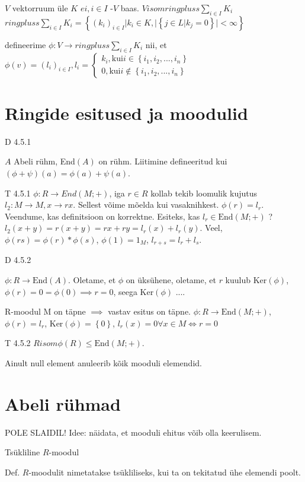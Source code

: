 \documentclass[12pt]{article}
\begin{document}
$V$ vektorruum \"ule $K$
$ei, i \in I$ -$V$ baas.
$V isom ringpluss \sum \limits_{i \in I} K_i$
$ringpluss \sum \limits_{i \in I} K_i = \left\{ (k_i)_{i \in I} | k_i \in K, | \left\{ j \in L | k_j = 0 \right\} | < \infty \right\}$

defineerime $\phi: V \to ringpluss \sum \limits_{i \in I} K_i$ nii, et $\phi(v) = (l_i)_{i \in I}, l_i = \begin{cases} k_i, \text{kui} i \in \left\{ i_1,i_2,...,i_n \right\} \\
0, \text{kui} i \not \in \left\{ i_1,i_2,...,i_n \right\}
\end{cases}$

\section{Ringide esitused ja moodulid}
D 4.5.1

$A$ Abeli r\"uhm, End$(A)$ on r\"uhm. Liitimine defineeritud kui $\left( \phi + \psi \right) \left( a \right) = \phi \left( a \right) + \psi \left( a \right)$. 

T 4.5.1
$\phi : R \to End(M;+)$, iga $r \in R$ kollab tekib loomulik kujutus $l_2: M \to M, x \to rx$. Sellest võime mõelda kui vasaknihkest.  $\phi \left( r \right ) = l_r$. Veendume, kas definitsioon on korrektne. Esiteks, kas $l_r \in \text{End}(M;+)$ ? $l_2 (x +y ) = r (x + y ) = rx + ry = l_r(x) + l_r(y)$. Veel, $\phi(rs) = \phi(r) * \phi(s)$, $\phi(1) = 1_M$, $l_{r+s} = l_r + l_s$.

D 4.5.2

$\phi: R \to \text{End}(A)$. Oletame, et $\phi$ on \"uks\"uhene, oletame, et $r$ kuulub Ker$(\phi)$, $\phi(r) = 0 = \phi(0) \implies r=0$, seega Ker$(\phi)$  ....

R-moodul M on täpne $\implies$ vastav esitus on täpne. $\phi : R \to \text{End}(M;+)$, $\phi(r) = l_r$, Ker$(\phi) = \left\{ 0 \right\}$, $l_r(x) = 0 \forall x \in M \iff r=0$

T 4.5.2
$R isom \phi(R) \leq \text{End} \left( M;+ \right)$.

Ainult null element anuleerib kõik mooduli elemendid. 

\section{Abeli r\"uhmad}
POLE SLAIDIL! 
Idee: näidata, et mooduli ehitus võib olla keerulisem. 

Tsükliline $R$-moodul 

Def. $R$-moodulit nimetatakse ts\"ukliliseks, kui ta on tekitatud \"uhe elemendi poolt. 
\end{document}
